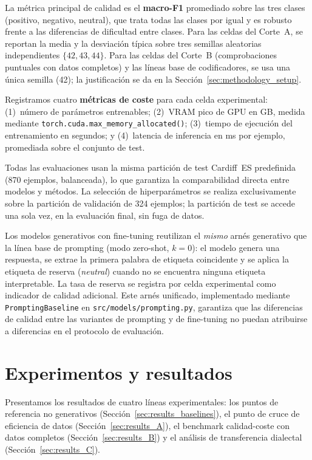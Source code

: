 \documentclass[conference]{IEEEtran}
\begin{document}
La métrica principal de calidad es el \textbf{macro-F1} promediado sobre las
tres clases (positivo, negativo, neutral), que trata todas las clases por igual
y es robusto frente a las diferencias de dificultad entre clases.
Para las celdas del Corte~A, se reportan la media y la desviación típica sobre
tres semillas aleatorias independientes $\{42, 43, 44\}$.
Para las celdas del Corte~B (comprobaciones puntuales con datos completos) y las
líneas base de codificadores, se usa una única semilla (42); la justificación se
da en la Sección~\ref{sec:methodology_setup}.

Registramos cuatro \textbf{métricas de coste} para cada celda experimental:
(1)~número de parámetros entrenables;
(2)~VRAM pico de GPU en GB, medida mediante
\texttt{torch.cuda.max\_memory\_allocated()};
(3)~tiempo de ejecución del entrenamiento en segundos; y
(4)~latencia de inferencia en ms por ejemplo, promediada sobre el conjunto de
test.

Todas las evaluaciones usan la misma partición de test Cardiff~ES predefinida
(870 ejemplos, balanceada), lo que garantiza la comparabilidad directa entre
modelos y métodos.
La selección de hiperparámetros se realiza exclusivamente sobre la partición de
validación de 324 ejemplos; la partición de test se accede una sola vez, en la
evaluación final, sin fuga de datos.

Los modelos generativos con fine-tuning reutilizan el \emph{mismo} arnés
generativo que la línea base de prompting (modo zero-shot, $k=0$): el modelo
genera una respuesta, se extrae la primera palabra de etiqueta coincidente y se
aplica la etiqueta de reserva (\textit{neutral}) cuando no se encuentra ninguna
etiqueta interpretable.
La tasa de reserva se registra por celda experimental como indicador de calidad
adicional.
Este arnés unificado, implementado mediante \texttt{PromptingBaseline} en
\texttt{src/models/prompting.py}, garantiza que las diferencias de calidad entre
las variantes de prompting y de fine-tuning no puedan atribuirse a diferencias en
el protocolo de evaluación.


\section{Experimentos y resultados}
\label{sec:results}

Presentamos los resultados de cuatro líneas experimentales: los puntos de
referencia no generativos (Sección~\ref{sec:results_baselines}), el punto de
cruce de eficiencia de datos (Sección~\ref{sec:results_A}), el benchmark
calidad-coste con datos completos (Sección~\ref{sec:results_B}) y el análisis de
transferencia dialectal (Sección~\ref{sec:results_C}).
\end{document}
